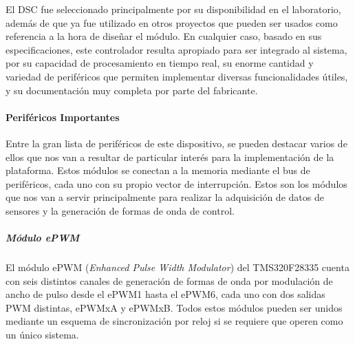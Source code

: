 El DSC fue seleccionado principalmente por su disponibilidad en el laboratorio, además de que ya fue utilizado en otros proyectos que pueden ser usados como referencia a la hora de diseñar el módulo. En cualquier caso, basado en sus especificaciones, este controlador resulta apropiado para ser integrado al sistema, por su capacidad de procesamiento en tiempo real, su enorme cantidad y variedad de periféricos que permiten implementar diversas funcionalidades útiles, y su documentación muy completa por parte del fabricante.\\

\paragraph{Periféricos Importantes}

Entre la gran lista de periféricos de este dispositivo, se pueden destacar varios de ellos que nos van a resultar de particular interés para la implementación de la plataforma. Estos módulos se conectan a la memoria mediante el bus de periféricos, cada uno con su propio vector de interrupción. Estos son los módulos que nos van a servir principalmente para realizar la adquisición de datos de sensores y la generación de formas de onda de control.

\subparagraph{Módulo ePWM}

El módulo ePWM (\textit{Enhanced Pulse Width Modulator}) del TMS320F28335 cuenta con seis distintos canales de generación de formas de onda por modulación de ancho de pulso desde el ePWM1 hasta el ePWM6, cada uno con dos salidas PWM distintas, ePWMxA y ePWMxB. Todos estos módulos pueden ser unidos mediante un esquema de sincronización por reloj si se requiere que operen como un único sistema.

